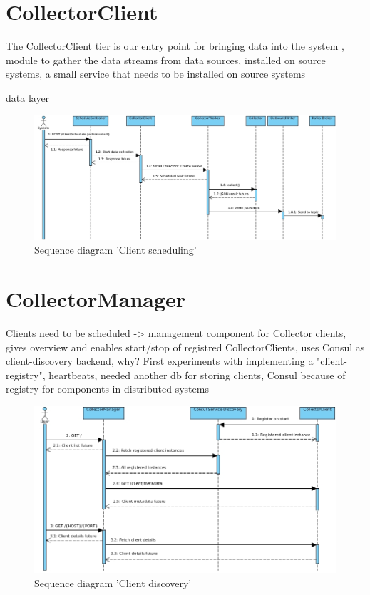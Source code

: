 \section{CollectorClient}

The CollectorClient tier is our entry point for bringing data into the system , module to gather the data streams
from data sources, installed on source systems, a small service that needs to be installed on source systems

data layer

\begin{figure}[H]
	\centering
	\includegraphics[width=1.0\textwidth]{../uml/sequence-scheduling.jpg}
	\caption{Sequence diagram 'Client scheduling'}
	\label{sequence-diagram-client-scheduling}
\end{figure}

\section{CollectorManager}

Clients need to be scheduled -> management component for Collector clients, gives overview and enables start/stop of
registred CollectorClients, uses Consul as client-discovery backend, why? First experiments with implementing a "client-registry",
heartbeats, needed another db for storing clients, Consul because of registry for components in distributed systems

\begin{figure}[H]
	\centering
	\includegraphics[width=1.0\textwidth]{../uml/sequence-discovery.jpg}
	\caption{Sequence diagram 'Client discovery'}
	\label{sequence-diagram-client-discovery}
\end{figure}

